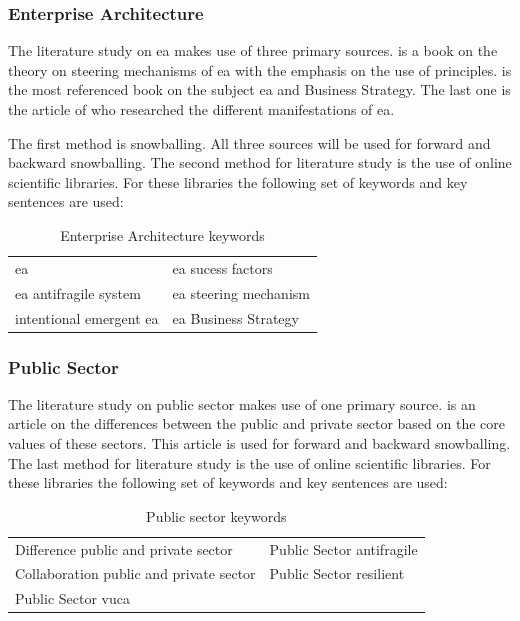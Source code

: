 \subsubsection{Enterprise Architecture}
\label{subsub:enterprisearchitecture}
The literature study on \acrshort{ea} makes use of three primary sources. \textcite{Greefhorst2011} is a book on the theory on steering mechanisms of \acrshort{ea} with the emphasis on the use of principles. \textcite{Ross2014} is the most referenced book on the subject \acrshort{ea} and Business Strategy. The last one is the article of \textcite{Lapalme2012} who researched the different manifestations of \acrshort{ea}.

The first method is snowballing. All three sources will be used for forward and backward snowballing. The second method for literature study is the use of online scientific libraries. For these libraries the following set of keywords and key sentences are used:
\bigskip

\begin{table}[H]
	\centering
\begin{tabular}{p{}p{}}
	\toprule
	\acrlong{ea} & \acrlong{ea} sucess factors\\%
	\acrlong{ea} \gls{antifragile} system	& \acrlong{ea} steering mechanism\\%
	intentional emergent \acrlong{ea} & \acrlong{ea} Business Strategy\\%
	\bottomrule
\end{tabular}
	\caption{Enterprise Architecture keywords}
\end{table}


\subsubsection{Public Sector}
\label{subsub:publicsector}
The literature study on public sector makes use of one primary source. \textcite{Wal2008} is an article on the differences between the public and private sector based on the core values of these sectors. This article is used for forward and backward snowballing. The last method for literature study is the use of online scientific libraries. For these libraries the following set of keywords and key sentences are used:
\bigskip

\begin{table}[H]
	\centering
	\begin{tabular}{p{}p{}}
		\toprule
		Difference public and private sector &	Public Sector \gls{antifragile}\\%
		Collaboration public and private sector & Public Sector \gls{resilient}\\%
		Public Sector \acrshort{vuca} & \\%
		\bottomrule
	\end{tabular}
	\caption{Public sector keywords}
\end{table}

